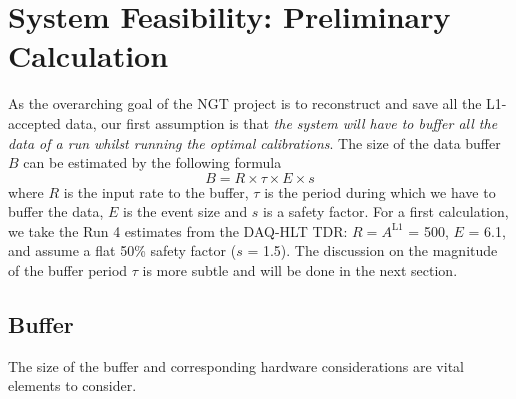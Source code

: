 \section{System Feasibility: Preliminary Calculation}
As the overarching goal of the NGT project is to reconstruct and save all the L1-accepted data, 
our first assumption is that 
\emph{the system will have to buffer all the data of a run whilst running the optimal calibrations}.
The size of the data buffer $B$ can be estimated by the following formula
\begin{equation}
B = R \times \tau \times E \times s
\label{eq:buffersize}
\end{equation}
where $R$ is the input rate to the buffer,
$\tau$ is the period during which we have to buffer the data,
$E$ is the event size and
$s$ is a safety factor.
For a first calculation, we take the Run 4 estimates from the DAQ-HLT TDR:
$R = A^\text{L1}$ = 500\kHz, $E$ = 6.1\MB,
and assume a flat 50\% safety factor ($s$ = 1.5).
The discussion on the magnitude of the buffer period $\tau$ is more subtle and will be done in the next section.

\subsection{Buffer}\label{sec:DAQbuffer}
The size of the buffer and corresponding hardware considerations are vital elements to consider.

